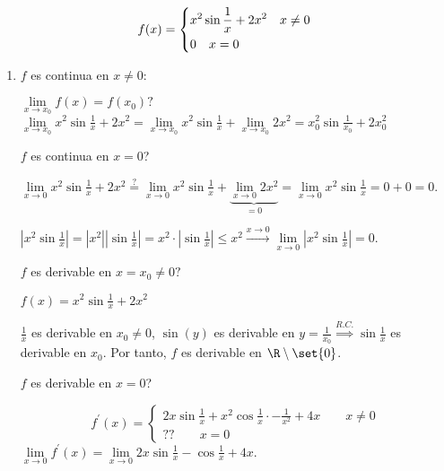 \begin{example}
	\label{ejnocont}
	\[
		f(x) = \begin{dcases}
			x^{2} \sin \frac{1}{x} + 2x^{2} \quad x \neq 0 \\
			0 \quad x = 0
		\end{dcases}
	\]
	\begin{enumerate}
		\item \(f \) es continua en \(x \neq  0 \):
		      
		      \(\lim\limits_{x  \to x_0 } f(x) = f(x_0)?\) \(\lim\limits_{x  \to x_0 } x^{2} \sin \frac{1}{x} + 2x^{2} = \lim\limits_{x  \to x_0 } x^{2} \sin \frac{1}{x} + \lim\limits_{x  \to x_0 } 2x^{2} =  x^{2}_0 \sin \frac{1}{x_0} + 	2x^{2}_0    \)
		      
		      \(f \) es continua en \(x = 0\)?
		      
		      \(\lim\limits_{x  \to 0 } x^{2} \sin \frac{1}{x} + 2x^{2} \overset{?}{=} \lim\limits_{x \to 0 } x^{2} \sin \frac{1}{x} + \underbrace{\lim\limits_{x  \to 0 } 2x^{2} }_{=0}= \lim\limits_{x  \to 0 } x^{2}\sin \frac{1}{x}  = 0 + 0 = 0  \).
		      
		      \(\left\vert x^{2} \sin \frac{1}{x}  \right\vert = \left\vert x^{2}  \right\vert \left\vert \sin \frac{1}{x } \right\vert = x^{2} \cdot \left\vert \sin \frac{1}{x } \right\vert  \leq x^{2} \overset{x\rightarrow 0}{\longrightarrow} \lim\limits_{x  \to 0 } \left\vert x^{2} \sin \frac{1}{x }  \right\vert = 0  \).
		      
		      \(f \) es derivable en \(x = x_0 \neq  0 ? \)
		      
		      \(f(x) = x^{2} \sin \frac{1}{x} + 2x^{2}  \)
		      
		      \(\frac{1}{x }\) es derivable en \(x_0 \neq 0 \), \(\sin (y )\) es derivable en \(y = \frac{1}{x_0 } \overset{R.C.}{\Rightarrow} \sin \frac{1}{x }\) es derivable en \(x_0 \).  Por tanto, \(f \) es derivable en \(\R \setminus \set{0 }\).
		      
		      \(f \) es derivable en \(x = 0 \)?
		      
		      \[
			      f^\prime (x) = \begin{cases}
				      2x \sin \frac{1}{x} + x^{2} \cos \frac{1}{x} \cdot - \frac{1}{x^{2} } + 4x \qquad x \neq 0 \\
				      ?? \qquad x = 0
			      \end{cases}
		      \]
		      \(\lim\limits_{x  \to 0 } f^\prime (x) = \lim\limits_{x  \to 0 } 2x \sin \frac{1}{x} - \cos \frac{1}{x} + 4x\).
		      

\end{enumerate}
\end{example}
